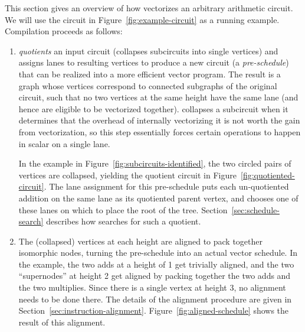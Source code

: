 This section gives an overview of how \system vectorizes an arbitrary arithmetic circuit.
We will use the circuit in Figure~\ref{fig:example-circuit} as a running example.
Compilation proceeds as follows:
\begin{enumerate}
    \item \system \textit{quotients} an input circuit (collapses subcircuits into single vertices) and assigns lanes to resulting vertices to produce a new circuit (a {\em pre-schedule}) that can be realized into a more efficient vector program. The result is a graph whose vertices correspond to connected subgraphs of the original circuit, such that no two vertices at the same height have the same lane (and hence are eligible to be vectorized together). \system collapses a subcircuit when it determines that the overhead of internally vectorizing it is not worth the gain from vectorization, so this step essentially forces certain operations to happen in scalar on a single lane. %
    
    In the example in Figure~\ref{fig:subcircuits-identified}, the two circled pairs of vertices are collapsed, yielding the quotient circuit in Figure~\ref{fig:quotiented-circuit}.
    The lane assignment for this pre-schedule puts each un-quotiented addition on the same lane as its quotiented parent vertex, and chooses one of these lanes on which to place the root of the tree.
    Section~\ref{sec:schedule-search} describes how \system searches for such a quotient. 
    
    \item The (collapsed) vertices at each height are aligned to pack together isomorphic nodes, turning the pre-schedule into an actual vector schedule. 
    In the example, the two adds at a height of 1 get trivially aligned, and the two ``supernodes'' at height 2 get aligned by packing together the two adds and the two multiplies.
    Since there is a single vertex at height 3, no alignment needs to be done there. 
    The details of the alignment procedure are given in Section~\ref{sec:instruction-alignment}.
    Figure~\ref{fig:aligned-schedule} shows the result of this alignment.
    

\end{enumerate}
